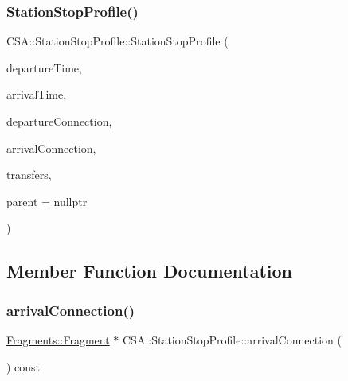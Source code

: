 \subsubsection{\texorpdfstring{Station\+Stop\+Profile()}{StationStopProfile()}}
{\footnotesize\ttfamily C\+S\+A\+::\+Station\+Stop\+Profile\+::\+Station\+Stop\+Profile (\begin{DoxyParamCaption}\item[{const Q\+Date\+Time \&}]{departure\+Time,  }\item[{const Q\+Date\+Time \&}]{arrival\+Time,  }\item[{\mbox{\hyperlink{classFragments_1_1Fragment}{Fragments\+::\+Fragment}} $\ast$}]{departure\+Connection,  }\item[{\mbox{\hyperlink{classFragments_1_1Fragment}{Fragments\+::\+Fragment}} $\ast$}]{arrival\+Connection,  }\item[{const qint16}]{transfers,  }\item[{Q\+Object $\ast$}]{parent = {\ttfamily nullptr} }\end{DoxyParamCaption})\hspace{0.3cm}{\ttfamily [explicit]}}



\subsection{Member Function Documentation}
\mbox{\label{classCSA_1_1StationStopProfile_a6cfce145f35c2263a21a207844470bec}} 
\subsubsection{\texorpdfstring{arrival\+Connection()}{arrivalConnection()}}
{\footnotesize\ttfamily \mbox{\hyperlink{classFragments_1_1Fragment}{Fragments\+::\+Fragment}} $\ast$ C\+S\+A\+::\+Station\+Stop\+Profile\+::arrival\+Connection (\begin{DoxyParamCaption}{ }\end{DoxyParamCaption}) const}

\mbox{\label{classCSA_1_1StationStopProfile_a3f7b89aa6a83653ae32102ccb04175cb}} 
